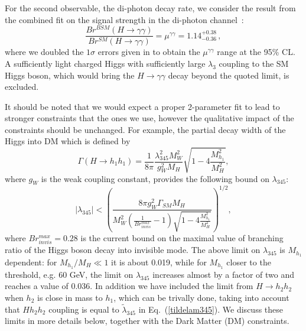 \documentclass[12pt,a4paper]{article}
\newcommand {\blue} {\color{blue}}
\newcommand{\comment}[1]{{\blue  #1}}
\begin{document}
For the second observable, the di-photon decay rate, we consider the result from the combined fit on the signal strength in the di-photon channel~\cite{Khachatryan:2016vau}:
\begin{equation}
\frac{Br^{BSM}(H\to \gamma\gamma)}{Br^{SM}(H\to \gamma\gamma)} =\mu^{\gamma\gamma} = 1.14^{+0.38}_{-0.36}\,,
\label{eq:lhc-higgs-aa}
\end{equation}
where we doubled the $1\sigma$ errors given in \cite{Khachatryan:2016vau} to obtain the $\mu^{\gamma\gamma}$ range at the 95\% CL.
A sufficiently light charged Higgs with sufficiently large $\lambda_3$ coupling to the SM Higgs boson,
which would bring the $H\to \gamma\gamma$ decay beyond the quoted limit, is excluded.

It should be noted that we would expect a proper 2-parameter 
fit to lead to stronger constraints that the ones we use, however the qualitative impact of the constraints should be unchanged.
For example, the partial decay width of the Higgs into  DM which is defined by
\begin{equation}
 \Gamma (H \to h_1 h_1) = \frac{1}{8\pi}\frac{\lambda_{345}^2 M_W^2}{g_W^2 M_H}\sqrt{1-4\frac{M_{h_1}^2}{M_H^2}},
\end{equation}
where $g_W$ is the weak coupling constant,  provides the following  bound on $\lambda_{345}$:
\begin{equation}
|\lambda_{345}| < 
\left(
\frac{8\pi g_W^2 \Gamma_{SM} M_H}{M_W^2 \left(\frac{1}{Br^{max}_{invis}}-1\right)\sqrt{1-4\frac{M_{h_1}^2}{M_H^2}}}	
\right)^{1/2},\label{lam345-limit-from-inv}
\end{equation}
where $Br^{max}_{invis}=0.28$ is the current bound on the maximal value of branching ratio
of the Higgs boson decay into invisible mode.
The above limit on $\lambda_{345}$ is $M_{h_1}$ dependent:
for  $M_{h_1}/M_{H} \ll 1$  it is about 0.019, while for  $M_{h_1}$ closer to the threshold,
e.g. 60 GeV, the limit on  $\lambda_{345}$ increases almost by a factor of two and reaches a value of 0.036.
In addition we have included the limit from $H\to h_2 h_2$
when $h_2$ is close in mass to $h_1$, which can be trivally done, taking into account that
$H h_2 h_2$ coupling is equal to $\tilde \lambda_{345}$ in Eq.~(\ref{tildelam345}).
We discuss these limits in more details below, together with the Dark Matter (DM) constraints.
\end{document}
